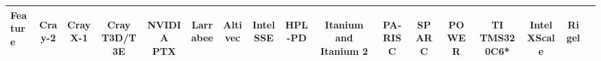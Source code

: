 \begin{landscape}

\begin{table}[htbp] 
\begin{tabular}{|l|c|c|c||c|c|c|c||c|c||c|c|c||c|c||c|c|} 
\hline Feature & 
               {\begin{sideways}Cray-2\end{sideways}} & 
               {\begin{sideways}Cray X-1\end{sideways}} & 
               {\begin{sideways}Cray T3D/T3E\end{sideways}} & 
               
               {\begin{sideways}NVIDIA PTX\end{sideways}} & 
               {\begin{sideways}Larrabee\end{sideways}} & 
               {\begin{sideways}Altivec\end{sideways}} & 
               {\begin{sideways}Intel SSE\end{sideways}} & 
               
               {\begin{sideways}HPL-PD\end{sideways}} & 
               {\begin{sideways}Itanium and Itanium 2\end{sideways}} & 
               
               {\begin{sideways}PA-RISC\end{sideways}} & 
               {\begin{sideways}SPARC\end{sideways}} & 
               {\begin{sideways}POWER\end{sideways}} & 
               
               {\begin{sideways}TI TMS320C6*\end{sideways}} &
               {\begin{sideways}Intel XScale\end{sideways}} & 
               
               {\begin{sideways}Rigel\end{sideways}} & 
               {\begin{sideways}\end{sideways}} 
               \\ \hline \hline
               

\end{tabular}
\end{table}
\end{landscape}
